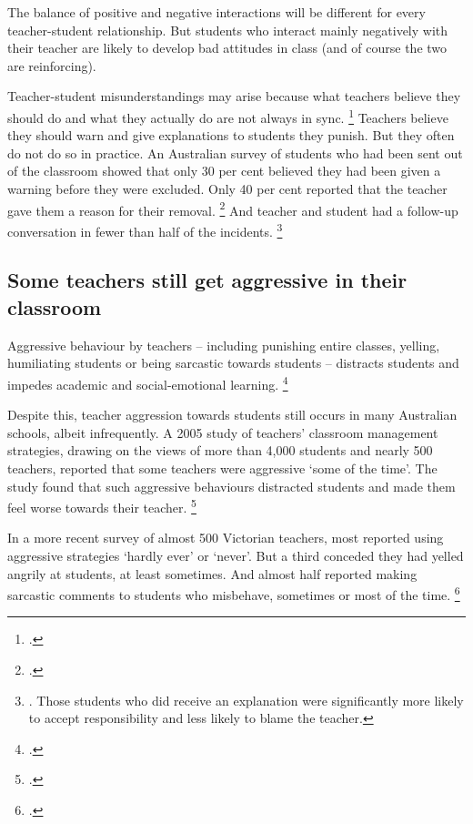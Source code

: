 \documentclass[FrontPage]{grattan}
\begin{document}
The balance of positive and negative interactions will be different for every teacher-student relationship. But students who interact mainly negatively with their teacher are likely to develop bad attitudes in class (and of course the two are reinforcing).
 
Teacher-student misunderstandings may arise because what teachers believe they should do and what they actually do are not always in sync.%
    \footcite{Fang1996ReviewResearchTeacher}
Teachers believe they should warn and give explanations to students they punish. But they often do not do so in practice. An Australian survey of students who had been sent out of the classroom showed that only 30 per cent believed they had been given a warning before they were excluded. Only 40 per cent reported that the teacher gave them a reason for their removal.%
    \footcite{Lewis2012ExcludingStudentsClassroom}
And teacher and student had a follow-up conversation in fewer than half of the incidents.%
    \footnote{\textcite{Lewis2012ExcludingStudentsClassroom}. Those students who did receive an explanation were significantly more likely to accept responsibility and less likely to blame the teacher.}

\subsection{Some teachers still get aggressive in their classroom}\label{subsec:some-teachers-get-aggressive}
Aggressive behaviour by teachers -- including punishing entire classes, yelling, humiliating students or being sarcastic towards students -- distracts students and impedes academic and social-emotional learning.%
    \footcites{Lewis2008StudentsReactionClassroom}{Lewis2001ClassroomDisciplineStudent}{RileyBrew2010WhyDidYouDoThat} 
 
Despite this, teacher aggression towards students still occurs in many Australian schools, albeit infrequently. A 2005 study of teachers' classroom management strategies, drawing on the views of more than 4,000 students and nearly 500 teachers, reported that some teachers were aggressive ‘some of the time'. The study found that such aggressive behaviours distracted students and made them feel worse towards their teacher.%
    \footcite{Lewis2008StudentsReactionClassroom}  

In a more recent survey of almost 500 Victorian teachers, most reported using aggressive strategies `hardly ever' or `never'. But a third conceded they had yelled angrily at students, at least sometimes. And almost half reported making sarcastic comments to students who misbehave, sometimes or most of the time.%
    \footcite{Romi2011ImpactTeachersAggressive}
 
\end{document}
